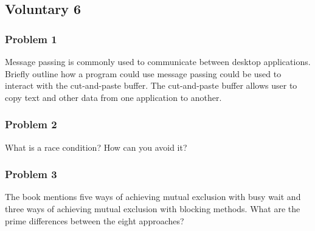 
\subsection*{Voluntary 6}

\subsubsection*{Problem 1}
Message passing is commonly used to communicate between desktop applications. Briefly outline how a program could use message passing could be used to interact with the cut-and-paste buffer. The cut-and-paste buffer allows user to copy text and other data from one application to another.

\subsubsection*{Problem 2}
What is a race condition? How can you avoid it?

\subsubsection*{Problem 3}
The book mentions five ways of achieving mutual exclusion with busy wait and three ways of achieving mutual exclusion with blocking methods. What are the prime differences between the eight approaches?